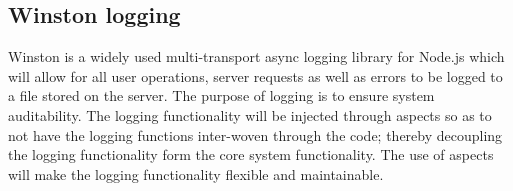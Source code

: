 \subsection{Winston logging}
Winston is a widely used multi-transport async logging library for Node.js which will allow for all user operations, server requests as well as errors to be logged to a file stored on the server. The purpose of logging is to ensure system auditability. The logging functionality will be injected through aspects so as to not have the logging functions inter-woven through the code; thereby decoupling the logging functionality form the core system functionality. The use of aspects will make the logging functionality flexible and maintainable.








